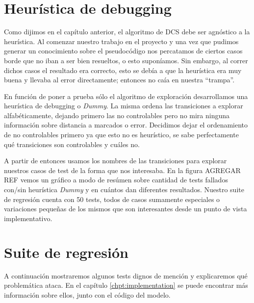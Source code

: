 
\section{Heurística de debugging}
Como dijimos en el capítulo anterior, el algoritmo de DCS debe ser agnóstico a la heurística. Al comenzar nuestro trabajo en el proyecto y una vez que pudimos generar un conocimiento sobre el pseudocódigo nos percatamos de ciertos casos borde que no iban a ser bien resueltos, o esto suponíamos. Sin embargo, al correr dichos casos el resultado era correcto, esto se debía a que la heurística era muy buena y llevaba al error directamente; entonces no caía en nuestra ``trampa''.

En función de poner a prueba sólo el algoritmo de exploración desarrollamos una heurística de debugging o \textit{Dummy}. La misma ordena las transiciones a explorar alfabéticamente, dejando primero las no controlables pero no mira ninguna información sobre distancia a marcados o error. Decidimos dejar el ordenamiento de no controlables primero ya que esto no es heurístico, se sabe perfectamente qué transiciones son controlables y cuáles no.

A partir de entonces usamos los nombres de las transiciones para explorar nuestros casos de test de la forma que nos interesaba. En la figura AGREGAR REF vemos un gráfico a modo de resúmen sobre cantidad de tests fallados con/sin heurística \textit{Dummy} y en cuántos dan diferentes resultados. 
Nuestro suite de regresión cuenta con 50 tests, todos de casos sumamente especiales o variaciones pequeñas de los mismos que son interesantes desde un punto de vista implementativo.


\section{Suite de regresión}
A continuación mostraremos algunos tests dignos de mención y explicaremos qué problemática ataca. En el capítulo \ref{chpt:implementation} se puede encontrar más información sobre ellos, junto con el código del modelo.


